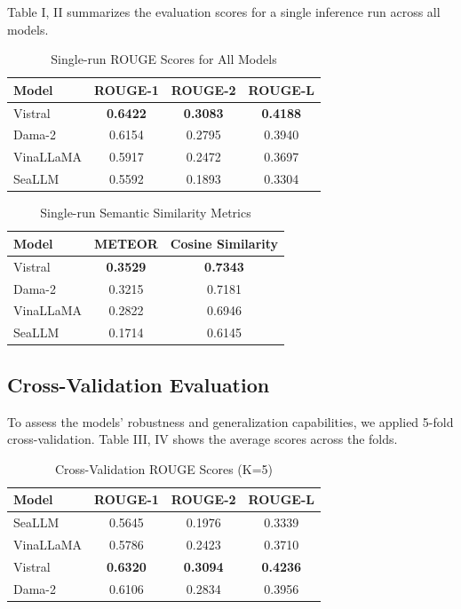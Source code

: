 \documentclass[conference]{IEEEtran}
\begin{document}
Table I, II summarizes the evaluation scores for a single inference run across all models.

\begin{table}[H]
\centering
\caption{Single-run ROUGE Scores for All Models}
\label{tab:rouge-single-run}
\begin{tabular}{|l|c|c|c|}
\hline
\textbf{Model} & \textbf{ROUGE-1} & \textbf{ROUGE-2} & \textbf{ROUGE-L} \\
\hline
Vistral       & \textbf{0.6422} & \textbf{0.3083} & \textbf{0.4188} \\
Dama-2        & 0.6154          & 0.2795          & 0.3940          \\
VinaLLaMA     & 0.5917          & 0.2472          & 0.3697          \\
SeaLLM        & 0.5592          & 0.1893          & 0.3304          \\
\hline
\end{tabular}
\end{table} 

\begin{table}[H]
\centering
\caption{Single-run Semantic Similarity Metrics}
\label{tab:semantic-single-run}
\begin{tabular}{|l|c|c|}
\hline
\textbf{Model} & \textbf{METEOR} & \textbf{Cosine Similarity} \\
\hline
Vistral       & \textbf{0.3529} & \textbf{0.7343} \\
Dama-2        & 0.3215          & 0.7181          \\
VinaLLaMA     & 0.2822          & 0.6946          \\
SeaLLM        & 0.1714          & 0.6145          \\
\hline
\end{tabular}
\end{table}

\subsection{Cross-Validation Evaluation}

To assess the models' robustness and generalization capabilities, we applied 5-fold cross-validation. Table III, IV shows the average scores across the folds.

\begin{table}[H]
\centering
\caption{Cross-Validation ROUGE Scores (K=5)}
\label{tab:cv-rouge}
\begin{tabular}{|l|c|c|c|}
\hline
\textbf{Model} & \textbf{ROUGE-1} & \textbf{ROUGE-2} & \textbf{ROUGE-L} \\
\hline
SeaLLM     & 0.5645 & 0.1976 & 0.3339 \\
VinaLLaMA  & 0.5786 & 0.2423 & 0.3710 \\
Vistral    & \textbf{0.6320} & \textbf{0.3094} & \textbf{0.4236} \\
Dama-2     & 0.6106 & 0.2834 & 0.3956 \\
\hline
\end{tabular}
\end{table}
\end{document}

